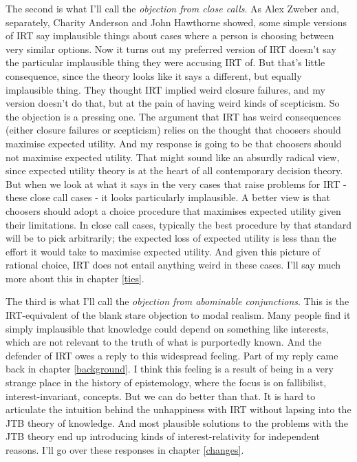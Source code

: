 \documentclass[
  11pt,
]{book}
\begin{document}
The second is what I'll call the \emph{objection from close calls}. As Alex Zweber \citeyearpar{Zweber2016} and, separately, Charity Anderson and John Hawthorne \citeyearpar{AndersonHawthorne2019a} showed, some simple versions of IRT say implausible things about cases where a person is choosing between very similar options. Now it turns out my preferred version of IRT doesn't say the particular implausible thing they were accusing IRT of. But that's little consequence, since the theory looks like it says a different, but equally implausible thing. They thought IRT implied weird closure failures, and my version doesn't do that, but at the pain of having weird kinds of scepticism. So the objection is a pressing one. The argument that IRT has weird consequences (either closure failures or scepticism) relies on the thought that choosers should maximise expected utility. And my response is going to be that choosers should not maximise expected utility. That might sound like an absurdly radical view, since expected utility theory is at the heart of all contemporary decision theory. But when we look at what it says in the very cases that raise problems for IRT - these close call cases - it looks particularly implausible. A better view is that choosers should adopt a choice procedure that maximises expected utility given their limitations. In close call cases, typically the best procedure by that standard will be to pick arbitrarily; the expected loss of expected utility is less than the effort it would take to maximise expected utility. And given this picture of rational choice, IRT does not entail anything weird in these cases. I'll say much more about this in chapter \ref{ties}.

The third is what I'll call the \emph{objection from abominable conjunctions}. This is the IRT-equivalent of the blank stare objection to modal realism. Many people find it simply implausible that knowledge could depend on something like interests, which are not relevant to the truth of what is purportedly known. And the defender of IRT owes a reply to this widespread feeling. Part of my reply came back in chapter \ref{background}. I think this feeling is a result of being in a very strange place in the history of epistemology, where the focus is on fallibilist, interest-invariant, concepts. But we can do better than that. It is hard to articulate the intuition behind the unhappiness with IRT without lapsing into the JTB theory of knowledge. And most plausible solutions to the problems with the JTB theory end up introducing kinds of interest-relativity for independent reasons. I'll go over these responses in chapter \ref{changes}.
\end{document}
